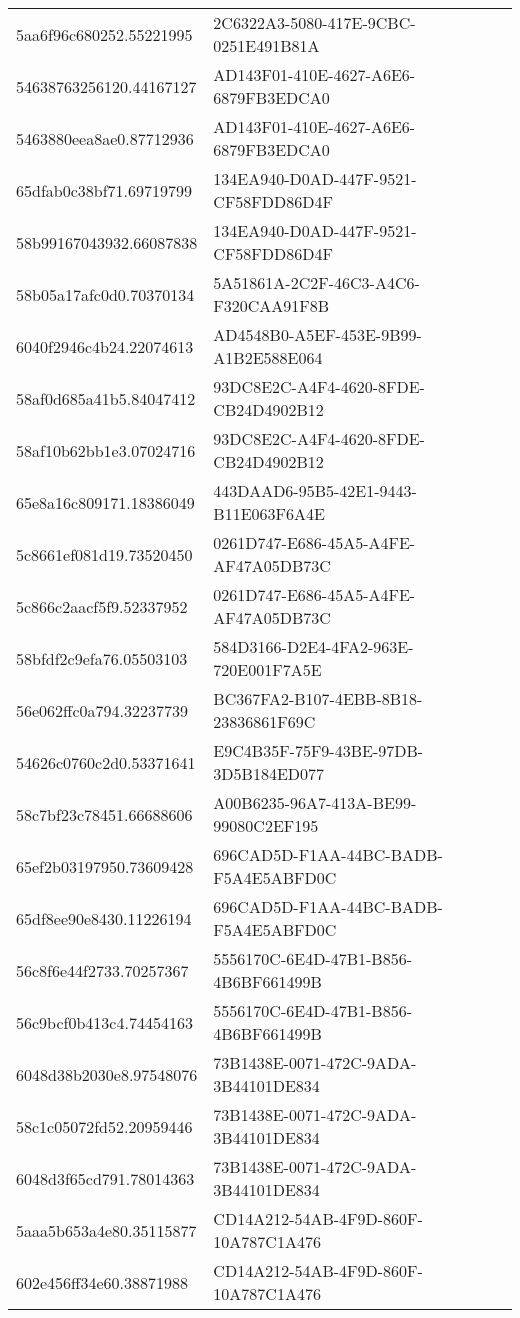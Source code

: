 \begin{tabular}{ll}
5aa6f96c680252.55221995 & 2C6322A3-5080-417E-9CBC-0251E491B81A \\
54638763256120.44167127 & AD143F01-410E-4627-A6E6-6879FB3EDCA0 \\
5463880eea8ae0.87712936 & AD143F01-410E-4627-A6E6-6879FB3EDCA0 \\
65dfab0c38bf71.69719799 & 134EA940-D0AD-447F-9521-CF58FDD86D4F \\
58b99167043932.66087838 & 134EA940-D0AD-447F-9521-CF58FDD86D4F \\
58b05a17afc0d0.70370134 & 5A51861A-2C2F-46C3-A4C6-F320CAA91F8B \\
6040f2946c4b24.22074613 & AD4548B0-A5EF-453E-9B99-A1B2E588E064 \\
58af0d685a41b5.84047412 & 93DC8E2C-A4F4-4620-8FDE-CB24D4902B12 \\
58af10b62bb1e3.07024716 & 93DC8E2C-A4F4-4620-8FDE-CB24D4902B12 \\
65e8a16c809171.18386049 & 443DAAD6-95B5-42E1-9443-B11E063F6A4E \\
5c8661ef081d19.73520450 & 0261D747-E686-45A5-A4FE-AF47A05DB73C \\
5c866c2aacf5f9.52337952 & 0261D747-E686-45A5-A4FE-AF47A05DB73C \\
58bfdf2c9efa76.05503103 & 584D3166-D2E4-4FA2-963E-720E001F7A5E \\
56e062ffc0a794.32237739 & BC367FA2-B107-4EBB-8B18-23836861F69C \\
54626c0760c2d0.53371641 & E9C4B35F-75F9-43BE-97DB-3D5B184ED077 \\
58c7bf23c78451.66688606 & A00B6235-96A7-413A-BE99-99080C2EF195 \\
65ef2b03197950.73609428 & 696CAD5D-F1AA-44BC-BADB-F5A4E5ABFD0C \\
65df8ee90e8430.11226194 & 696CAD5D-F1AA-44BC-BADB-F5A4E5ABFD0C \\
56c8f6e44f2733.70257367 & 5556170C-6E4D-47B1-B856-4B6BF661499B \\
56c9bcf0b413c4.74454163 & 5556170C-6E4D-47B1-B856-4B6BF661499B \\
6048d38b2030e8.97548076 & 73B1438E-0071-472C-9ADA-3B44101DE834 \\
58c1c05072fd52.20959446 & 73B1438E-0071-472C-9ADA-3B44101DE834 \\
6048d3f65cd791.78014363 & 73B1438E-0071-472C-9ADA-3B44101DE834 \\
5aaa5b653a4e80.35115877 & CD14A212-54AB-4F9D-860F-10A787C1A476 \\
602e456ff34e60.38871988 & CD14A212-54AB-4F9D-860F-10A787C1A476 \\

\end{tabular}
